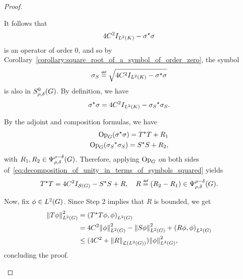 \begin{proof}
\begin{description}
            It follows that
            \begin{align*}
                4 C^2 \Id {\Lebesgue 2 \CompactGroup} - \adj \sigma \sigma
            \end{align*}
            is an operator of order $0$,
            and so by Corollary~\ref{corollary:square_root_of_a_symbol_of_order_zero}, the symbol
            \begin{align*}
                \sigma_S \defeq \sqrt{4 C^2 \Id {\Lebesgue 2 \CompactGroup} - \adj \sigma \sigma}
            \end{align*}
            is also in $\SymbolClass 0 {\rho, \delta}$.
            By definition, we have
            \begin{align}
                \adj \sigma \sigma = 4 C^2 \Id {\Lebesgue 2 \CompactGroup} - \adj {\sigma_S} \sigma_S.
                \label{eq:decomposition_of_unity_in_terms_of_symbols_squared}
            \end{align}

            By the adjoint and composition formulas,
            we have
            \begin{align*}
                \Op(\adj \sigma \sigma) = \adj T T + R_1\\
                \Op(\adj {\sigma_S} \sigma_S) = \adj S S +  R_2,
            \end{align*}
            with $R_1, R_2 \in \OperatorClass {\rho - \delta} {\rho, \delta}$.
            Therefore, applying $\Op$ on both sides of~\eqref{eq:decomposition_of_unity_in_terms_of_symbols_squared} yields
            \begin{align*}
                \adj T T = 4 C^2 \Id {\Schwartz \Group} - \adj S S + R,
                \quad R \defeq (R_2 - R_1) \in \OperatorClass {\rho - \delta} {\rho, \delta}.
            \end{align*}

            Now, fix $\phi \in \Lebesgue 2 \Group$.
            Since Step 2 implies that $R$ is bounded,
            we get
            \begin{align*}
                \norm [\Lebesgue 2 \Group] {T \phi}^2
                &= \ip [\Lebesgue 2 \Group] {\adj T T \phi} \phi\\
                &= 4 C^2 \norm [\Lebesgue 2 \Group] \phi^2 - \norm [\Lebesgue 2 \Group] {S \phi}^2 + \ip [\Lebesgue 2 \Group] {R \phi} {\phi}\\
                &\leq (4 C^2 + \norm [\Lin {\Lebesgue 2 \Group}] R) \norm [\Lebesgue 2 \Group] \phi^2,
            \end{align*}
            concluding the proof.
    \end{description}
\end{proof}

